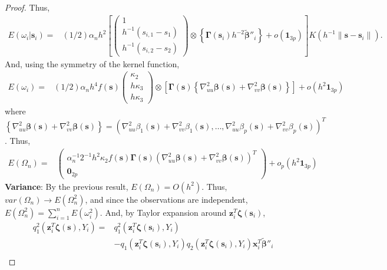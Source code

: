 \documentclass[authoryear,review, 12pt]{elsarticle}
\begin{document}
\begin{proof}
Thus,
\begin{align*}
E\left(\omega_{i}|\bm{s}_{i}\right)= & \left(1/2\right)\alpha_{n}h^{2}\left[\left(\begin{array}{c}
1\\
h^{-1}(s_{i,1}-s_{1})\\
h^{-1}(s_{i,2}-s_{2})
\end{array}\right)\otimes\left\{ \bm{\Gamma}(\bm{s}_{i})h^{-2}\tilde{\bm{\beta}}''_{i}\right\} +o\left(\bm{1}_{3p}\right)\right]K\left(h^{-1}\|\bm{s}-\bm{s}_{i}\|\right).
\end{align*}
And, using the symmetry of the kernel function,
\begin{align*}
E\left(\omega_{i}\right)= & (1/2)\alpha_{n}h^{4}f(\bm{s})\left(\begin{array}{c}
\kappa_{2}\\
h\kappa_{3}\\
h\kappa_{3}
\end{array}\right)\otimes\left[\bm{\Gamma}(\bm{s})\left\{ \nabla_{uu}^{2}\bm{\beta}(\bm{s})+\nabla_{vv}^{2}\bm{\beta}(\bm{s})\right\} \right]+o\left(h^{2}\bm{1}_{3p}\right)
\end{align*}
where $\left\{ \nabla_{uu}^{2}\bm{\beta}(\bm{s})+\nabla_{vv}^{2}\bm{\beta}(\bm{s})\right\} =\left(\nabla_{uu}^{2}\beta_{1}(\bm{s})+\nabla_{vv}^{2}\beta_{1}(\bm{s}),\dots,\nabla_{uu}^{2}\beta_{p}(\bm{s})+\nabla_{vv}^{2}\beta_{p}(\bm{s})\right)^{T}$.
Thus,
\begin{align*}
E\left(\Omega_{n}\right)= & \left(\begin{array}{c}
\alpha_{n}^{-1}2^{-1}h^{2}\kappa_{2}f(\bm{s})\bm{\Gamma}(\bm{s})\left(\nabla_{uu}^{2}\bm{\beta}(\bm{s})+\nabla_{vv}^{2}\bm{\beta}(\bm{s})\right)^{T}\\
\bm{0}_{2p}
\end{array}\right)+o_{p}\left(h^{2}\bm{1}_{3p}\right)
\end{align*}
\textbf{Variance}: By the previous result, $E\left(\Omega_{n}\right)=O\left(h^{2}\right)$.
Thus, $var\left(\Omega_{n}\right)\to E\left(\Omega_{n}^{2}\right)$,
and since the observations are independent, $E\left(\Omega_{n}^{2}\right)=\sum_{i=1}^{n}E\left(\omega_{i}^{2}\right)$.
And, by Taylor expansion around $\bm{z}_{i}^{T}\bm{\zeta}(\bm{s}_{i})$, 
\begin{align*}
q_{1}^{2}\left(\bm{z}_{i}^{T}\bm{\zeta}(\bm{s}),Y_{i}\right)= & q_{1}^{2}\left(\bm{z}_{i}^{T}\bm{\zeta}(\bm{s}_{i}),Y_{i}\right)\\
 & -q_{1}\left(\bm{z}_{i}^{T}\bm{\zeta}(\bm{s}_{i}),Y_{i}\right)q_{2}\left(\bm{z}_{i}^{T}\bm{\zeta}(\bm{s}_{i}),Y_{i}\right)\bm{x}_{i}^{T}\tilde{\bm{\beta}}''_{i}\\

\end{align*}
\end{proof}
\end{document}

